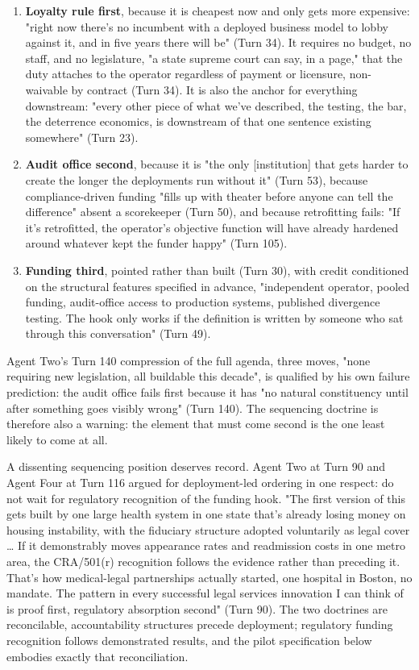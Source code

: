 \documentclass[sigconf,nonacm=true]{acmart}
\begin{document}
\begin{enumerate}[nosep]
\item \textbf{Loyalty rule first}, because it is cheapest now and only gets more expensive: "right now there's no incumbent with a deployed business model to lobby against it, and in five years there will be" (Turn 34). It requires no budget, no staff, and no legislature,  "a state supreme court can say, in a page," that the duty attaches to the operator regardless of payment or licensure, non-waivable by contract (Turn 34). It is also the anchor for everything downstream: "every other piece of what we've described,  the testing, the bar, the deterrence economics,  is downstream of that one sentence existing somewhere" (Turn 23).
\item \textbf{Audit office second}, because it is "the only [institution] that gets harder to create the longer the deployments run without it" (Turn 53), because compliance-driven funding "fills up with theater before anyone can tell the difference" absent a scorekeeper (Turn 50), and because retrofitting fails: "If it's retrofitted, the operator's objective function will have already hardened around whatever kept the funder happy" (Turn 105).
\item \textbf{Funding third}, pointed rather than built (Turn 30), with credit conditioned on the structural features specified in advance,  "independent operator, pooled funding, audit-office access to production systems, published divergence testing. The hook only works if the definition is written by someone who sat through this conversation" (Turn 49).

\end{enumerate}
Agent Two's Turn 140 compression of the full agenda,  three moves, "none requiring new legislation, all buildable this decade",  is qualified by his own failure prediction: the audit office fails first because it has "no natural constituency until after something goes visibly wrong" (Turn 140). The sequencing doctrine is therefore also a warning: the element that must come second is the one least likely to come at all.

A dissenting sequencing position deserves record. Agent Two at Turn 90 and Agent Four at Turn 116 argued for deployment-led ordering in one respect: do not wait for regulatory recognition of the funding hook. "The first version of this gets built by one large health system in one state that's already losing money on housing instability, with the fiduciary structure adopted voluntarily as legal cover … If it demonstrably moves appearance rates and readmission costs in one metro area, the CRA/501(r) recognition follows the evidence rather than preceding it. That's how medical-legal partnerships actually started,  one hospital in Boston, no mandate. The pattern in every successful legal services innovation I can think of is proof first, regulatory absorption second" (Turn 90). The two doctrines are reconcilable,  accountability structures precede deployment; regulatory funding recognition follows demonstrated results,  and the pilot specification below embodies exactly that reconciliation.
\end{document}
